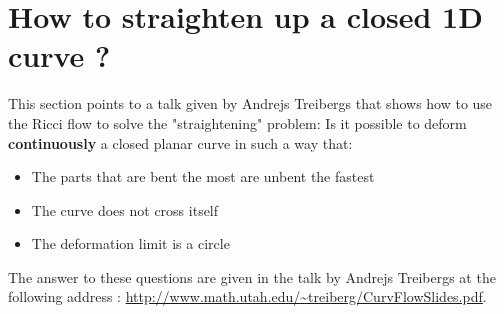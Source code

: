 \documentclass[10pt]{article}
\begin{document}
\section{How to straighten up a closed 1D curve ?}

This section points to a talk given by Andrejs Treibergs that shows how to use the Ricci flow to solve the "straightening" problem: Is it possible to deform \textbf{continuously} a closed planar curve in such a way that:
\begin{itemize}
\item The parts that are bent the most are unbent the fastest
\item The curve does not cross itself
\item The deformation limit is a circle
\end{itemize}

The answer to these questions are given in the talk by Andrejs Treibergs at the following address : \url{http://www.math.utah.edu/~treiberg/CurvFlowSlides.pdf}.
\end{document}
